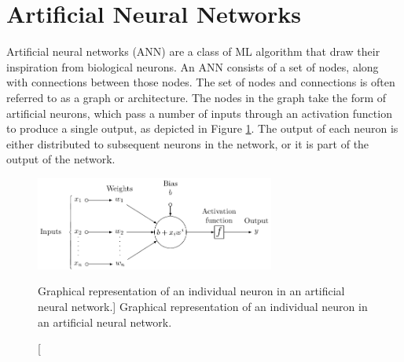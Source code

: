 \section{Artificial Neural Networks}
Artificial neural networks (ANN) are a class of ML algorithm that draw their
inspiration from biological neurons. An ANN consists of a set of nodes, along
with connections between those nodes. The set of nodes and connections is 
often referred to as a graph or architecture. The nodes in the graph take the 
form of artificial neurons, which pass a number of inputs through an 
activation function to produce a single output, as depicted in Figure 
\ref{fig:neuron}. The output of each neuron is either distributed to 
subsequent neurons in the network, or it is part of the output of the network. 
\begin{figure}

	\centering

	\includegraphics[width = 0.7\textwidth]{figures/neuron.pdf}

	\caption
	[Graphical representation of an individual neuron in an artificial neural
	network.]
	{Graphical representation of an individual neuron in an artificial neural
	network.}

	\label{fig:neuron}

\end{figure}

